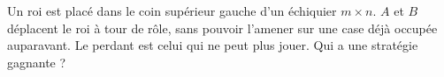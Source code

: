 Un roi est placé dans le coin supérieur gauche d'un échiquier $m \times n$. $A$ et $B$ déplacent le roi à tour de rôle, sans pouvoir l'amener sur une case déjà occupée auparavant. Le perdant est celui qui ne peut plus jouer. Qui a une stratégie gagnante ?
